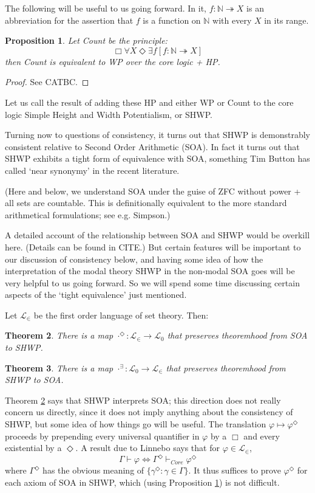 \documentclass{article}
\newtheorem{theorem}{Theorem}
\newtheorem{proposition}[theorem]{Proposition}
\begin{document}
The following will be useful to us going forward. In it, $f : \mathbb{N} \twoheadrightarrow X$
is an abbreviation for the assertion that $f$ is a function on $\mathbb{N}$ with every $X$ in its range.

\begin{proposition}\label{SHWP0}
    Let Count  be the principle:
    $$\Box \forall X \Diamond \exists f[f : \mathbb{N} \twoheadrightarrow X] $$ 
    then Count is equivalent to WP over the core logic + HP.
\end{proposition}
\begin{proof}
    See CATBC.
\end{proof}
Let us call the result of adding these HP and either WP or Count
 to the core logic 
 Simple Height and Width Potentialism, or SHWP.

Turning now to questions of consistency, 
it turns out that SHWP is 
demonstrably consistent relative to Second Order Arithmetic (SOA). 
In fact it turns out that SHWP exhibits a tight form of equivalence with SOA,
something Tim Button has called `near synonymy' in the 
recent literature. 

(Here and below, we understand SOA under the guise of 
ZFC without power + all sets are countable. This is 
definitionally equivalent to the more standard
arithmetical formulations; see e.g. Simpson.)

A detailed account of the relationship between SOA and SHWP would be overkill here.
(Details can be found in CITE.) But certain features will be important 
to our discussion of consistency below, and having some idea of how the interpretation 
of the modal theory SHWP in the non-modal SOA goes will be very 
helpful to us going forward. 
So we will spend some time discussing certain aspects of the `tight equivalence'
just mentioned.

Let $\mathcal{L}_\in$ be the first order 
language of set theory. Then:
\begin{theorem}\label{SHWP1}
    There is a map $\cdot^\Diamond : \mathcal{L}_\in \to \mathcal{L}_0$ that preserves 
    theoremhood from SOA to SHWP.
\end{theorem}
\begin{theorem}\label{SHWP2}
    There is a map $\cdot^\exists : \mathcal{L}_0 \to \mathcal{L}_\in$ that preserves 
    theoremhood from SHWP to
    SOA.
\end{theorem}
Theorem \ref{SHWP1} says that SHWP interprets SOA; this 
direction does not really concern us directly, since it does not 
imply anything about the consistency of SHWP, but some 
idea of how things go will be useful.
The translation $\varphi \mapsto \varphi^\Diamond$ proceeds by prepending every 
universal quantifier in $\varphi$ by a $\Box$ and every existential by a $\Diamond$.
A result due to Linnebo says that for $\varphi \in \mathcal{L}_\in$, 
\[\Gamma \vdash \varphi \Leftrightarrow \Gamma^\Diamond \vdash_{Core} \varphi^\Diamond\]
where $\Gamma^\Diamond$ has the obvious meaning of $\{\gamma^\Diamond : \gamma \in \Gamma\}$.
It thus suffices to prove $\varphi^\Diamond$ for each axiom of SOA in SHWP, 
which (using Proposition \ref{SHWP0}) is not difficult. 
\end{document}
